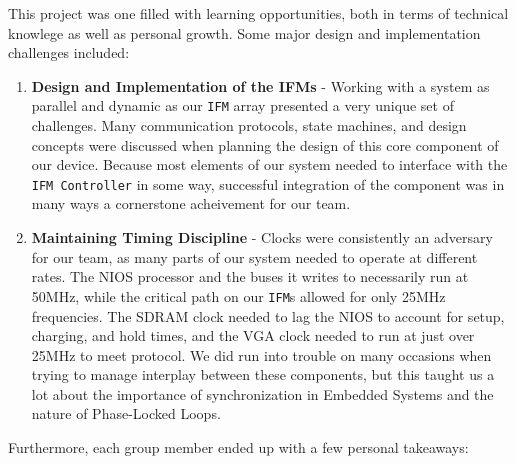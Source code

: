 \documentclass{article}
\begin{document}
This project was one filled with learning opportunities, both in terms of technical knowlege as well as
personal growth. Some major design and implementation challenges included:

\begin{enumerate}{}
\item \textbf{Design and Implementation of the IFMs} - Working with a system as parallel and dynamic as our \texttt{IFM} array presented a very unique set of challenges. Many communication protocols, state machines, and design concepts were
discussed when planning the design of this core component of our device. Because most elements of our system needed
to interface with the \texttt{IFM Controller} in some way, successful integration of the component was in many ways a cornerstone acheivement for our team.

\item \textbf{Maintaining Timing Discipline} - Clocks were consistently an adversary for our team, as many parts 
of our system needed to operate at different rates. The NIOS processor and the buses it writes to necessarily run at 50MHz, while the critical path on our \texttt{IFM}s allowed for only 25MHz frequencies. The SDRAM clock needed to lag the NIOS to account for setup, charging, and hold times, and the VGA clock needed to run at just over 25MHz to meet protocol. We did run into trouble on many occasions when trying to manage interplay between these components, but this taught us a lot about the importance of synchronization in Embedded Systems and the nature of Phase-Locked Loops.

\end{enumerate}

Furthermore, each group member ended up with a few personal takeaways:
\end{document}
